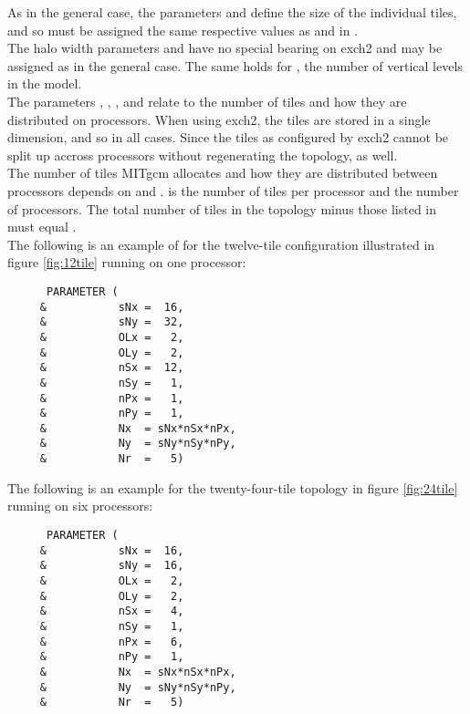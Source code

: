 As in the general case, the parameters  and
 define the size of the individual tiles, and so
must be assigned the same respective values as  and
 in .\\

The halo width parameters  and 
have no special bearing on exch2 and may be assigned as in the general
case. The same holds for , the number of vertical 
levels in the model.\\

The parameters , ,
, and  relate to the number of
tiles and how they are distributed on processors.  When using exch2,
the tiles are stored in a single dimension, and so
 in all cases.  Since the tiles as
configured by exch2 cannot be split up accross processors without
regenerating the topology,  as well. \\

The number of tiles MITgcm allocates and how they are distributed
between processors depends on  and
.   is the number of tiles per
processor and  the number of processors.  The total
number of tiles in the topology minus those listed in
 must equal . \\

The following is an example of  for the twelve-tile
configuration illustrated in figure \ref{fig:12tile} running on 
one processor: \\

\begin{verbatim}
      PARAMETER (
     &           sNx =  16,
     &           sNy =  32,
     &           OLx =   2,
     &           OLy =   2,
     &           nSx =  12,
     &           nSy =   1,
     &           nPx =   1,
     &           nPy =   1,
     &           Nx  = sNx*nSx*nPx,
     &           Ny  = sNy*nSy*nPy,
     &           Nr  =   5)
\end{verbatim}

The following is an example for the twenty-four-tile topology in
figure \ref{fig:24tile} running on six processors:

\begin{verbatim}
      PARAMETER (
     &           sNx =  16,
     &           sNy =  16,
     &           OLx =   2,
     &           OLy =   2,
     &           nSx =   4,
     &           nSy =   1,
     &           nPx =   6,
     &           nPy =   1,
     &           Nx  = sNx*nSx*nPx,
     &           Ny  = sNy*nSy*nPy,
     &           Nr  =   5)
\end{verbatim}





